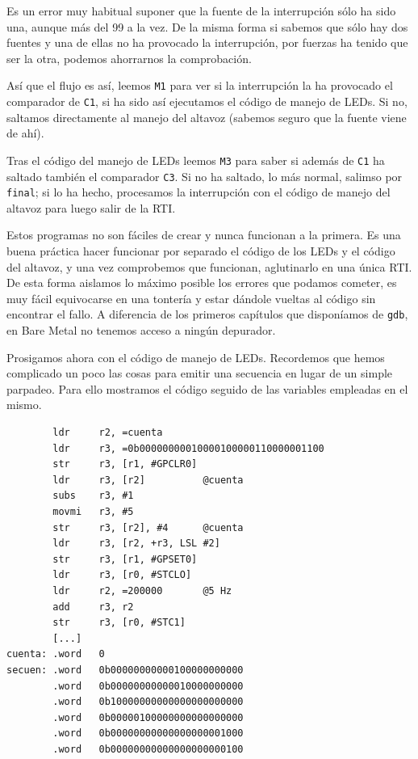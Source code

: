 Es un error muy habitual suponer que la fuente de la interrupción sólo ha sido una, aunque
más del 99%
a la vez. De la misma forma si sabemos que sólo hay dos fuentes y una de ellas no ha
provocado la interrupción, por fuerzas ha tenido que ser la otra, podemos ahorrarnos la
comprobación.

Así que el flujo es así, leemos {\tt M1} para ver si la interrupción la ha provocado el
comparador de {\tt C1}, si ha sido así ejecutamos el código de manejo de LEDs. Si no,
saltamos directamente al manejo del altavoz (sabemos seguro que la fuente viene de ahí).

Tras el código del manejo de LEDs leemos {\tt M3} para saber si además de {\tt C1} ha
saltado también el comparador {\tt C3}. Si no ha saltado, lo más normal, salimso por
{\tt final}; si lo ha hecho, procesamos la interrupción con el código de manejo del altavoz
para luego salir de la RTI.

Estos programas no son fáciles de crear y nunca funcionan a la primera. Es una buena práctica
hacer funcionar por separado el código de los LEDs y el código del altavoz, y una vez
comprobemos que funcionan, aglutinarlo en una única RTI. De esta forma aislamos lo máximo
posible los errores que podamos cometer, es muy fácil equivocarse en una tontería y estar
dándole vueltas al código sin encontrar el fallo. A diferencia de los primeros capítulos
que disponíamos de {\tt gdb}, en Bare Metal no tenemos acceso a ningún depurador.

Prosigamos ahora con el código de manejo de LEDs. Recordemos que hemos complicado un poco
las cosas para emitir una secuencia en lugar de un simple parpadeo. Para ello mostramos
el código seguido de las variables empleadas en el mismo.

\begin{lstlisting}
        ldr     r2, =cuenta
        ldr     r3, =0b00000000010000100000110000001100
        str     r3, [r1, #GPCLR0]
        ldr     r3, [r2]          @cuenta
        subs    r3, #1
        movmi   r3, #5
        str     r3, [r2], #4      @cuenta
        ldr     r3, [r2, +r3, LSL #2]
        str     r3, [r1, #GPSET0]
        ldr     r3, [r0, #STCLO]
        ldr     r2, =200000       @5 Hz
        add     r3, r2
        str     r3, [r0, #STC1]
        [...]
cuenta: .word   0
secuen: .word   0b00000000000100000000000
        .word   0b00000000000010000000000
        .word   0b10000000000000000000000
        .word   0b00000100000000000000000
        .word   0b00000000000000000001000
        .word   0b00000000000000000000100
\end{lstlisting}

